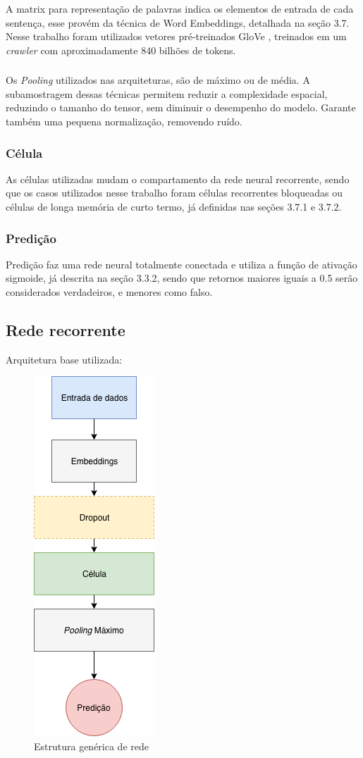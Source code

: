 \documentclass[12pt]{article}
\begin{document}
A matrix para representação de palavras indica os elementos de entrada de cada sentença, esse provém da técnica de Word Embeddings, detalhada na seção 3.7. Nesse trabalho foram utilizados vetores pré-treinados GloVe \cite{pennington2014glove}, treinados em um \textit{crawler} com aproximadamente 840 bilhões de tokens.

\subsubsection{}

Os \textit{Pooling} utilizados nas arquiteturas, são de máximo ou de média. A subamostragem dessas técnicas permitem reduzir a complexidade espacial, reduzindo o tamanho do tensor, sem diminuir o desempenho do modelo. Garante também uma pequena normalização, removendo ruído.

\subsubsection{Célula}

As células utilizadas mudam o compartamento da rede neural recorrente, sendo que os casos utilizados nesse trabalho foram células recorrentes bloqueadas ou células de longa memória de curto termo, já definidas nas seções 3.7.1 e 3.7.2.

\subsubsection{Predição}

Predição faz uma rede neural totalmente conectada e utiliza a função de ativação sigmoide, já descrita na seção 3.3.2,  sendo que retornos maiores iguais a 0.5 serão considerados verdadeiros, e menores como falso.

\subsection{Rede recorrente}

Arquitetura base utilizada:

\begin{figure}[!htb]
\centering
\includegraphics[width=.2\textwidth]{images/graph_2.png}
\caption{Estrutura genérica de rede}
\label{fig:graph_2}
\end{figure}
\end{document}
